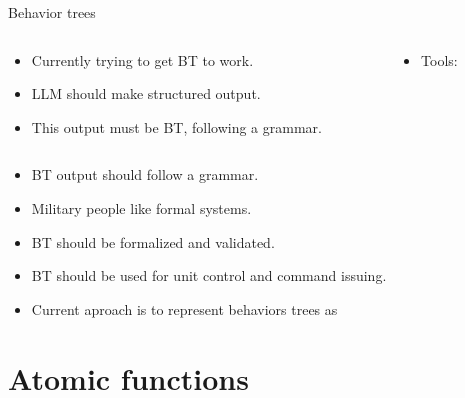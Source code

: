 \documentclass[aspectratio=32]{beamer}
\providecommand{\tightlist}{\setlength{\itemsep}{0pt}\setlength{\parskip}{0pt}}
\begin{document}
  \begin{frame}[allowframebreaks]{\textbar{} Behavior trees}
  \begin{columns}[T]
  \begin{column}{0.48\textwidth}
  \begin{itemize}
  \tightlist
  \item
    Currently trying to get BT to work.
  \item
    LLM should make structured output.
  \item
    This output must be BT, following a grammar.
  \end{itemize}
  \end{column}

  \begin{column}{0.48\textwidth}
  \begin{itemize}
  \tightlist
  \item
    Tools:

  \end{itemize}
  \end{column}
  \end{columns}

  \framebreak

  \begin{itemize}
  \item
    BT output should follow a grammar.
  \item
    Military people like formal systems.
  \item
    BT should be formalized and validated.
  \item
    BT should be used for unit control and command issuing.
  \item
    Current aproach is to represent behaviors trees as
  \end{itemize}
  \end{frame}

  \section{\textbar{} Atomic functions}\label{atomic-functions}
\end{document}
